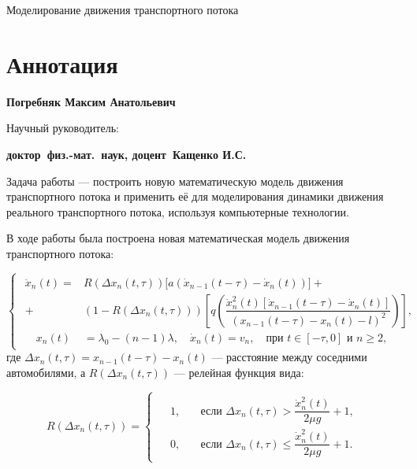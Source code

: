 \documentclass[12pt, a4paper]{extarticle}
\numberwithin{equation}{section}
\numberwithin{figure}{section}
\newcommand{\dfmn}{{\mdseries доктор~физ.-мат.~наук}}
\newcommand{\doc}{{\mdseries доцент}}
\newcommand{\atitle}[1]{\begin{center}{\Large #1\par}\end{center}}
\newcommand{\swise}[1]{\noindent Научный руководитель: {\bfseries #1\par}}
\begin{document}
\atitle{Моделирование движения транспортного потока}
\thispagestyle{empty} 
\medskip

\justify 
\setlength{\parindent}{1.25cm} 
\thispagestyle{empty} 

\setcounter{page}{1}
\section*{Аннотация}
\noindent\textbf{Погребняк Максим Анатольевич}\par
\swise{\dfmn, \doc~Кащенко И.С.}

\medskip

Задача работы --- построить новую математическую модель движения транспортного потока и применить её для моделирования динамики движения реального транспортного потока, используя компьютерные технологии.                                          

В ходе работы была построена новая математическая модель движения транспортного потока:

\begin{equation} \label{ann_new_model}
\begin{cases}
\begin{split}
\ddot{x}_n(t)= &R(\Delta x_n(t,\tau))\bigg[ a(\dot{x}_{n-1}(t-\tau)-\dot{x}_n(t))\bigg]  +\\+& (1-R(\Delta x_n(t,\tau)))\left[  q\left(  \dfrac{\dot{x}_n^2(t)\left[  \dot{x}_{n-1}(t-\tau) - \dot{x}_n(t) \right]}{(x_{n-1}(t-\tau)-x_n(t)-l)^2}\right) \right], \\
\quad x_n(t)&=\lambda_0-(n-1)\lambda, \quad \dot{x}_n(t)=v_{n}, \quad \text{при } t \in [-\tau,0] \text{ и } n\geq2,
\end{split}
\end{cases}
\end{equation}
где $\Delta x_{n}(t,\tau)=x_{n-1}(t-\tau)-x_n(t)$ --- расстояние между соседними автомобилями, а $R(\Delta x_{n}(t,\tau))$ --- релейная функция вида:

\begin{equation} \label{ann_rele}
R(\Delta x_{n}(t,\tau))=
\begin{cases}
\begin{split}
&1,\quad &\text{если }\Delta x_{n}(t,\tau) > \dfrac{\dot{x}_n^2(t)}{2\mu g}+1, \\
&0,\quad &\text{если }\Delta x_{n}(t,\tau) \leq \dfrac{\dot{x}_n^2(t)}{2\mu g}+1.
\end{split}
\end{cases}
\end{equation}
\end{document}
